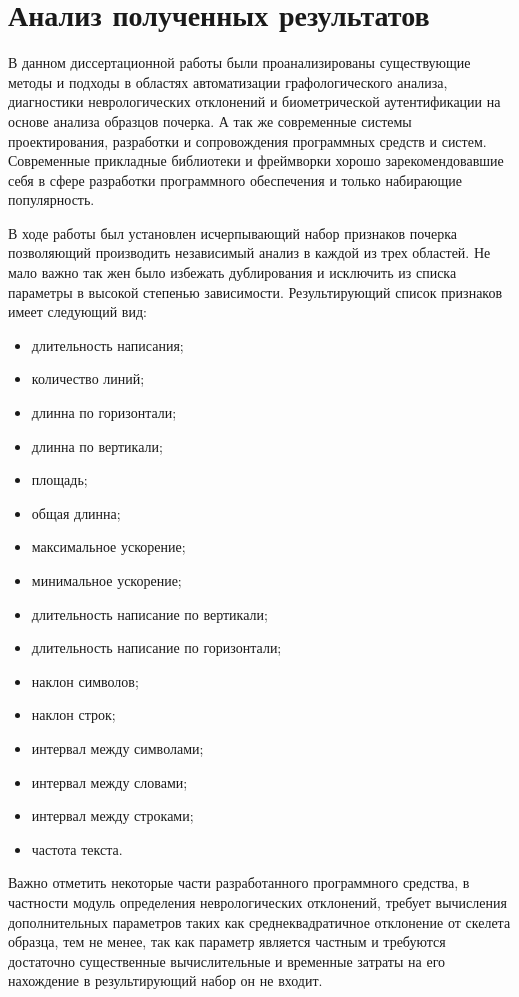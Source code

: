 \section{Анализ полученных результатов}
\label{sec:summary}

В данном диссертационной работы были проанализированы существующие методы и подходы в областях автоматизации графологического анализа, диагностики неврологических отклонений и биометрической аутентификации на основе анализа образцов почерка. А так же современные системы проектирования, разработки и сопровождения программных средств и систем. Современные прикладные библиотеки и фреймворки хорошо зарекомендовавшие себя в сфере разработки программного обеспечения и только набирающие популярность.

В ходе работы был установлен исчерпывающий набор признаков почерка позволяющий производить независимый анализ в каждой из трех областей. Не мало важно так жен было избежать дублирования и исключить из списка параметры в высокой степенью зависимости.
Результирующий список признаков имеет следующий вид:
\begin{itemize}
  \item длительность написания;  
  \item количество линий;
  \item длинна по горизонтали;
  \item длинна по вертикали;
  \item площадь;
  \item общая длинна;
  \item максимальное ускорение;
  \item минимальное ускорение;
  \item длительность написание по вертикали;
  \item длительность написание по горизонтали;
  \item наклон символов;
  \item наклон строк;
  \item интервал между символами;
  \item интервал между словами;
  \item интервал между строками;
  \item частота текста.
\end{itemize}

Важно отметить некоторые части разработанного программного средства, в частности модуль определения неврологических отклонений, требует вычисления дополнительных параметров таких как среднеквадратичное отклонение от скелета образца, тем не менее, так как параметр является частным и требуются достаточно существенные вычислительные и временные затраты на его нахождение в результирующий набор он не входит.

